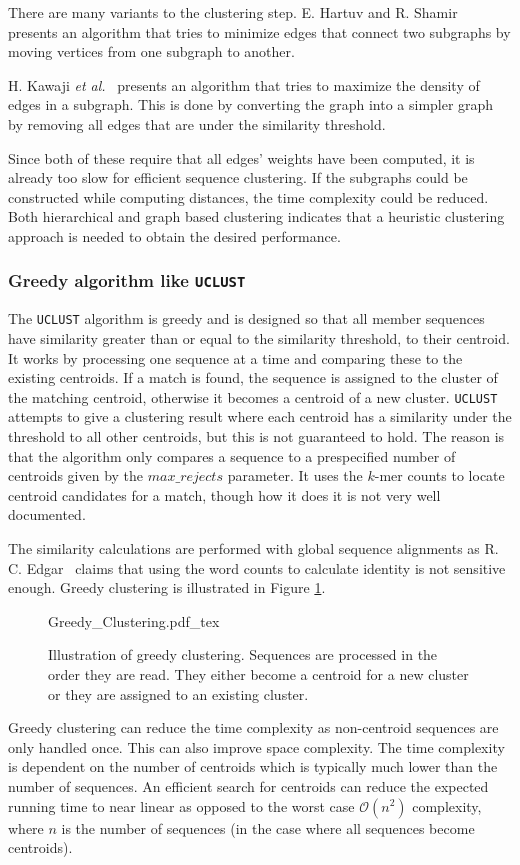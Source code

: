 There are many variants to the clustering step. E. Hartuv and R. Shamir \\
\cite{hartuv} presents an algorithm that tries to minimize edges that
connect two subgraphs by moving vertices from one subgraph to another.

H. Kawaji \textit{et al.}~\cite{kawaji} presents an algorithm that tries to
maximize the density of edges in a subgraph. This is done by converting the
graph into a simpler graph by removing all edges that are under the similarity
threshold.

Since both of these require that all edges' weights have been computed, it is
already too slow for efficient sequence clustering. If the subgraphs could be
constructed while computing distances, the time complexity could be reduced.
Both hierarchical and graph based clustering indicates that a heuristic
clustering approach is needed to obtain the desired performance.


\subsubsection{Greedy algorithm like \texttt{UCLUST}}

The \texttt{UCLUST} algorithm is greedy and is designed so that all member
sequences have similarity greater than or equal to the similarity threshold,
to their centroid.  It works by processing one sequence at a time and
comparing these to the existing centroids. If a match is found, the sequence
is assigned to the cluster of the matching centroid, otherwise it becomes a
centroid of a new cluster. \texttt{UCLUST} attempts to give a clustering
result where each centroid has a similarity under the threshold to all other
centroids, but this is not guaranteed to hold. The reason is that the
algorithm only compares a sequence to a prespecified number of centroids given
by the $max\_rejects$ parameter. It uses the $k$-mer counts to locate centroid
candidates for a match, though how it does it is not very well documented.

The similarity calculations are performed with global sequence alignments as R.
C. Edgar~\cite{usearch_algorithm}  claims that using the word counts to
calculate identity is not sensitive enough. Greedy clustering is illustrated in
Figure \ref{fig:greedy_clustering}.

\begin{figure}[H]
  \def\svgwidth{\columnwidth}
  {Greedy_Clustering.pdf_tex}
  \caption{Illustration of greedy clustering. Sequences are processed in the
    order they are read. They either become a centroid for a new cluster or
    they are assigned to an existing cluster.}
  \label{fig:greedy_clustering}
\end{figure}

Greedy clustering can reduce the time complexity as non-centroid sequences are
only handled once. This can also improve space complexity. The time complexity
is dependent on the number of centroids which is typically much lower than the
number of sequences. An efficient search for centroids can reduce the expected
running time to near linear as opposed to the worst case
$\mathcal{O}\left(n^2\right)$ complexity, where $n$ is the number of sequences
(in the case where all sequences become centroids).
